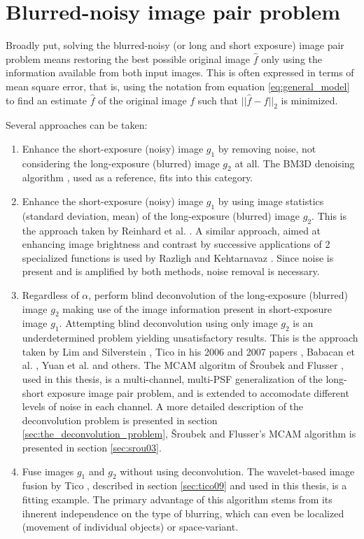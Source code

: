 \documentclass[12pt,notitlepage]{report}
\begin{document}
\section{Blurred-noisy image pair problem}
\label{sec:blurred_noisy}

Broadly put, solving the blurred-noisy (or long and short exposure) image pair problem means restoring the best possible original image $\hat{f}$ only using the information available from both input images. This is often expressed in terms of mean square error, that is, using the notation from equation \ref{eq:general_model} to find an estimate $\hat{f}$ of the original image $f$ such that $|| \hat{f} - f ||_2$ is minimized.

Several approaches can be taken:
\begin{enumerate}
	\item Enhance the short-exposure (noisy) image $g_1$ by removing noise, not considering the long-exposure (blurred) image $g_2$ at all. The BM3D denoising algorithm \cite{bm3d}, used as a reference, fits into this category.
	\item Enhance the short-exposure (noisy) image $g_1$ by using image statistics (standard deviation, mean) of the long-exposure (blurred) image $g_2$. This is the approach taken by Reinhard et al. \cite{rein01}. A similar approach, aimed at enhancing image brightness and contrast by successive applications of 2 specialized functions is used by Razligh and Kehtarnavaz \cite{razl07}. Since noise is present and is amplified by both methods, noise removal is necessary. 
	\item Regardless of $\alpha$, perform blind deconvolution of the long-exposure (blurred) image $g_2$ making use of the image information present in short-exposure image $g_1$. Attempting blind deconvolution using only image $g_2$ is an underdetermined problem yielding unsatisfactory results. This is the approach taken by Lim and Silverstein \cite{lim08}, Tico in his 2006 and 2007 papers \cite{tico06} \cite{tico07},  Babacan et al. \cite{baba09}, Yuan et al. \cite{yuan07} and others. The MCAM algoritm of Šroubek and Flusser \cite{srou03}, used in this thesis, is a multi-channel, multi-PSF generalization of the long-short exposure image pair problem, and is extended to accomodate different levels of noise in each channel. A more detailed description of the deconvolution problem is presented in section \ref{sec:the_deconvolution_problem}, Šroubek and Flusser's MCAM algorithm is presented in section \ref{sec:srou03}.
	\item Fuse images $g_1$ and $g_2$ without using deconvolution. The wavelet-based image fusion by Tico \cite{tico09}, described in section \ref{sec:tico09} and used in this thesis, is a fitting example. The primary advantage of this algorithm stems from its ihnerent independence on the type of blurring, which can even be localized (movement of individual objects) or space-variant.
\end{enumerate}  
\end{document}
